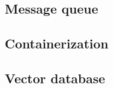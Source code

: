 \documentclass[../main.tex]{subfiles}
\begin{document}
\subsection{Message queue}
\label{sec:message_queue}

\subsection{Containerization}
\label{sec:containerization}

\subsection{Vector database}
\label{sec:vector_database}
\end{document}
